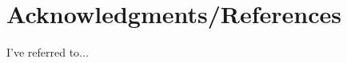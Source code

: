 \documentclass[12pt]{article}
\begin{document}
\newpage



\section*{Acknowledgments/References}

I've referred to...




	
\end{document}
